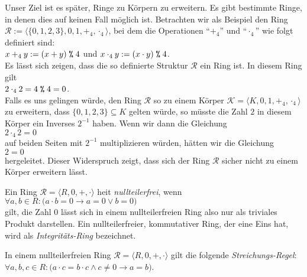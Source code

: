 Unser Ziel ist es sp\"{a}ter, Ringe zu K\"{o}rpern zu erweitern.  Es gibt bestimmte Ringe, in
denen dies auf keinen Fall m\"{o}glich ist.  Betrachten wir als Beispiel den Ring
$\mathcal{R} := \langle \{ 0, 1, 2, 3 \}, 0, 1, +_4, \cdot_4 \rangle$, bei dem die Operationen
``$+_4$'' und ``$\cdot_4$'' wie folgt definiert sind:
\\[0.2cm]
\hspace*{1.3cm}
$x +_4 y := (x + y) \;\texttt{\%}\; 4$ \quad und \quad
$x \cdot_4 y := (x \cdot y) \;\texttt{\%}\; 4$.
\\[0.2cm]
Es l\"{a}sst sich zeigen, dass die so definierte Struktur $\mathcal{R}$ ein Ring ist.  In
diesem Ring gilt
\\[0.2cm]
\hspace*{1.3cm}
$2 \cdot_4 2 = 4 \;\texttt{\%}\; 4 = 0$.
\\[0.2cm]
Falls es uns gelingen w\"{u}rde, den Ring $\mathcal{R}$ so zu einem K\"{o}rper 
$\mathcal{K} = \langle K, 0, 1, +_4, \cdot_4 \rangle$ zu erweitern, dass 
$\{0,1,2,3\} \subseteq K$ gelten w\"{u}rde, so m\"{u}sste die Zahl 
$2$ in diesem K\"{o}rper ein Inverses $2^{-1}$ haben.  Wenn wir dann die Gleichung
\\[0.2cm]
\hspace*{1.3cm}
$2 \cdot_4 2 = 0$
\\[0.2cm]
auf beiden Seiten mit $2^{-1}$ multiplizieren w\"{u}rden, h\"{a}tten wir die Gleichung
\\[0.2cm]
\hspace*{1.3cm}
$2 = 0$
\\[0.2cm]
hergeleitet.  Dieser Widerspruch zeigt, dass sich der Ring $\mathcal{R}$ sicher nicht zu
einem K\"{o}rper erweitern l\"{a}sst.

\begin{Definition}
  Ein Ring $\mathcal{R} = \langle R, 0, +, \cdot \rangle$ hei\3t {\color{blue}\emph{nullteilerfrei}}, wenn
  \\[0.2cm]
  \hspace*{1.3cm}
  $\forall a, b \in R: \bigl(a \cdot b = 0 \rightarrow a = 0 \vee b = 0\bigr)$
  \\[0.2cm]
  gilt, die Zahl $0$ l\"{a}sst sich in einem nullteilerfreien Ring also nur als triviales Produkt darstellen.
  Ein nullteilerfreier, kommutativer Ring, der eine Eins hat, wird als {\color{blue}\emph{Integrit\"{a}ts-Ring}}
  bezeichnet.
\eox
\end{Definition}

\remark
In einem nullteilerfreien Ring $\mathcal{R} = \langle R, 0, +, \cdot \rangle$ 
gilt die folgende \emph{Streichungs-Regel}:
\\[0.2cm]
\hspace*{1.3cm}
$\forall a,b,c \in R: \bigl(a \cdot c = b \cdot c \wedge c \not= 0 \rightarrow a = b)$.
\eox

